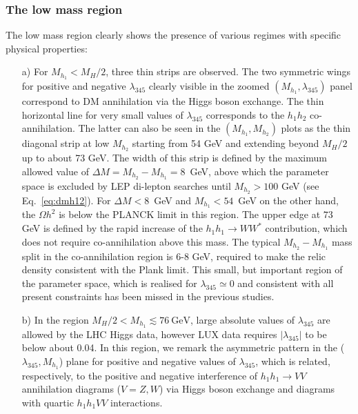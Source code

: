 \documentclass[12pt,a4paper]{article}
\begin{document}
\subsubsection{The low mass region}

The low mass region clearly shows the presence of various regimes with specific physical properties:
\begin{itemize}
\item[a)] For $M_{h_1}< M_H/2$, three thin strips are observed. The two symmetric wings for positive and negative $\lambda_{345}$ 
clearly visible in the zoomed $(M_{h_1},\lambda_{345})$ panel correspond to DM annihilation via the Higgs boson exchange. 
The thin horizontal line for very small values of $\lambda_{345}$ corresponds to the $h_1h_2$ co-annihilation. 
The latter can also be seen in the $(M_{h_1},M_{h_2})$ plots as the thin diagonal strip at low $M_{h_2}$
starting from 54 GeV and extending beyond $M_H/2$ up to about 73 GeV.
%
%
The width of this strip is defined by 
the maximum allowed value of $\Delta M = M_{h_2}-M_{h_1}=8$~GeV, above which
the parameter space is excluded by LEP di-lepton searches until $M_{h_2} > 100$ GeV (see Eq.~\ref{eq:dmh12}). For  $\Delta M<8$~GeV
and $M_{h_1}<54$~GeV on the other hand, the $\Omega h^2$ is below the PLANCK limit in this region. The upper edge
at $73$ GeV is defined by the rapid increase of the  $h_1 h_1 \to W W^*$ contribution,
which does not require co-annihilation above this mass. The typical $M_{h_2}-M_{h_1}$
mass split in the co-annihilation region is 6-8 GeV, required to make the relic density 
consistent with the Plank limit.
This small, but important region of the parameter space, which is realised for  $\lambda_{345} \simeq 0$
and consistent with all present constraints has been missed in the previous studies.

\item[b)] In the region $M_H/2<  M_{h_1} \lesssim 76~\mbox{GeV}$,  
large absolute values of  $\lambda_{345}$ are allowed by the LHC Higgs data, however LUX data requires $|\lambda_{345}|$ to be below about 0.04.
In this region, we remark the asymmetric pattern in the ($\lambda_{345},M_{h_1}$) plane
for positive and negative values of $\lambda_{345}$, which is related, respectively, to the 
positive and negative interference of  $h_1 h_1 \to VV$ annihilation diagrams ($V=Z,W$) via Higgs boson exchange
and diagrams with quartic $h_1 h_1 V V$  interactions. 
\end{itemize}
\end{document}
